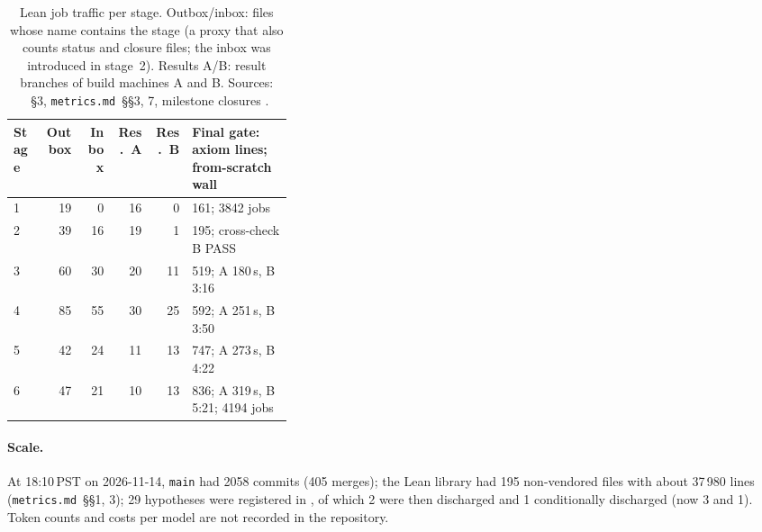 \begin{table}[ht]
\centering\small\sloppy
\begin{tabular}{@{}lrrrrp{0.36\linewidth}@{}}
\toprule
Stage & Outbox & Inbox & Res.\ A & Res.\ B & Final gate: axiom lines; from-scratch wall \\
\midrule
1 & 19 & 0 & 16 & 0 & 161; 3842 jobs \\
2 & 39 & 16 & 19 & 1 & 195; cross-check B PASS \\
3 & 60 & 30 & 20 & 11 & 519; A 180\,s, B 3:16 \\
4 & 85 & 55 & 30 & 25 & 592; A 251\,s, B 3:50 \\
5 & 42 & 24 & 11 & 13 & 747; A 273\,s, B 4:22 \\
6 & 47 & 21 & 10 & 13 & 836; A 319\,s, B 5:21; 4194 jobs \\
\bottomrule
\end{tabular}
\caption{Lean job traffic per stage. Outbox/inbox: files whose name contains the stage (a proxy that also counts status
and closure files; the inbox was introduced in stage~2). Results A/B: result branches of build machines A and B.
Sources: ~\S3, \texttt{metrics.md}~\S\S3, 7, milestone closures
.}\label{tab:agentic-jobs}
\end{table}

\begin{sloppypar}
\paragraph{Scale.} At 18:10\,PST on 2026-11-14, \texttt{main} had 2058 commits (405 merges); the Lean library had 195
non-vendored files with about 37\,980 lines (\texttt{metrics.md}~\S\S1, 3); 29 hypotheses were registered in
, of which 2 were then discharged and 1 conditionally discharged (now 3 and 1). Token counts and
costs per model are not recorded in the repository.
\end{sloppypar}
